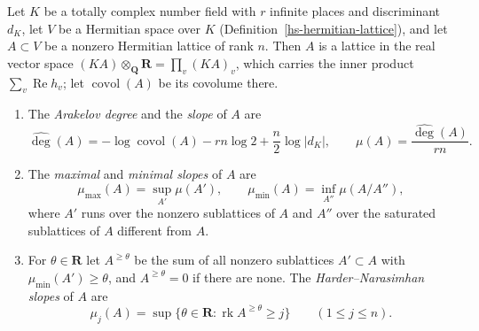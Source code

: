 \begin{definition}\label{hs-slopes}
Let $K$ be a totally complex number field with $r$ infinite places and discriminant $d_K$, let
$V$ be a Hermitian space over $K$ (Definition~\ref{hs-hermitian-lattice}), and let $A\subset V$
be a nonzero Hermitian lattice of rank $n$. Then $A$ is a lattice in the real vector space
$(KA)\otimes_{\mathbf Q}\mathbf R=\prod_v(KA)_v$, which carries the inner product
$\sum_v\operatorname{Re}h_v$; let $\operatorname{covol}(A)$ be its covolume there.
\begin{enumerate}
\item The \emph{Arakelov degree} and the \emph{slope} of $A$ are
  \[
   \widehat{\deg}(A)=-\log\operatorname{covol}(A)-rn\log2+\frac n2\log|d_K|,
   \qquad
   \mu(A)=\frac{\widehat{\deg}(A)}{rn}.
  \]
\item The \emph{maximal} and \emph{minimal slopes} of $A$ are
  \[
   \mu_{\max}(A)=\sup_{A'}\mu(A'),\qquad \mu_{\min}(A)=\inf_{A''}\mu(A/A''),
  \]
  where $A'$ runs over the nonzero sublattices of $A$ and $A''$ over the saturated sublattices
  of $A$ different from $A$.
\item For $\theta\in\mathbf R$ let $A^{\geq\theta}$ be the sum of all nonzero sublattices
  $A'\subset A$ with $\mu_{\min}(A')\geq\theta$, and $A^{\geq\theta}=0$ if there are none.
  The \emph{Harder--Narasimhan slopes} of $A$ are
  \[
   \mu_j(A)=\sup\{\theta\in\mathbf R:\operatorname{rk}A^{\geq\theta}\geq j\}
   \qquad(1\leq j\leq n).
  \]
\end{enumerate}
\end{definition}

